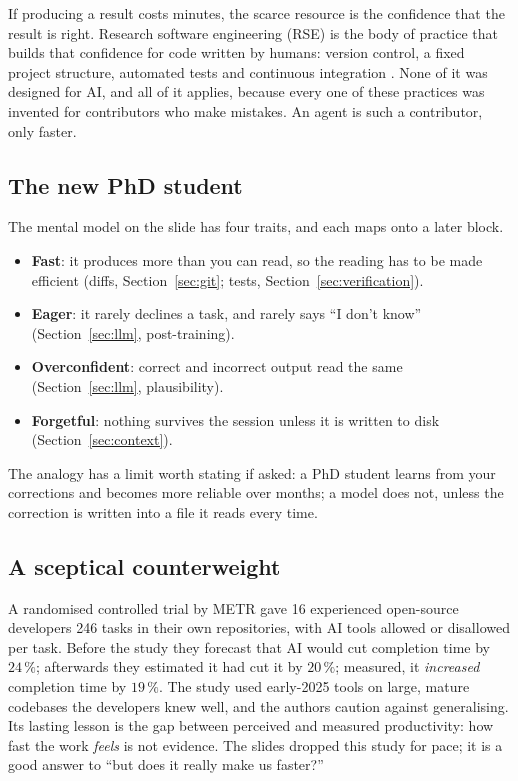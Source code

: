 If producing a result costs minutes, the scarce resource is the confidence that the
result is right. Research software engineering (RSE) is the body of practice that builds
that confidence for code written by humans: version control, a fixed project structure,
automated tests and continuous integration . None of it was
designed for AI, and all of it applies, because every one of these practices was
invented for contributors who make mistakes. An agent is such a contributor, only
faster.

\subsection{The new PhD student}

The mental model on the slide has four traits, and each maps onto a later block.
\begin{itemize}
  \item \textbf{Fast}: it produces more than you can read, so the reading has to be
        made efficient (diffs, Section~\ref{sec:git}; tests, Section~\ref{sec:verification}).
  \item \textbf{Eager}: it rarely declines a task, and rarely says ``I don't know''
        (Section~\ref{sec:llm}, post-training).
  \item \textbf{Overconfident}: correct and incorrect output read the same
        (Section~\ref{sec:llm}, plausibility).
  \item \textbf{Forgetful}: nothing survives the session unless it is written to disk
        (Section~\ref{sec:context}).
\end{itemize}
The analogy has a limit worth stating if asked: a PhD student learns from your
corrections and becomes more reliable over months; a model does not, unless the
correction is written into a file it reads every time.

\subsection{A sceptical counterweight}

A randomised controlled trial by METR  gave 16 experienced open-source
developers 246 tasks in their own repositories, with AI tools allowed or disallowed per
task. Before the study they forecast that AI would cut completion time by $24\,\%$;
afterwards they estimated it had cut it by $20\,\%$; measured, it \emph{increased}
completion time by $19\,\%$. The study used early-2025 tools on large, mature codebases
the developers knew well, and the authors caution against generalising. Its lasting
lesson is the gap between perceived and measured productivity: how fast the work
\emph{feels} is not evidence. The slides dropped this study for pace; it is a good answer
to ``but does it really make us faster?''

